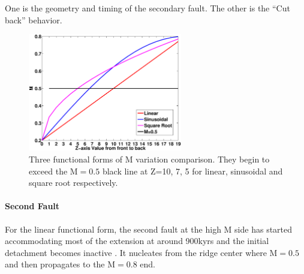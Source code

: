  One is the geometry and timing of the secondary fault. The other is the ``Cut back'' behavior. 

\begin{figure}[h]
  \centering
    \includegraphics[width=0.6\textwidth]{./Figures/fig_Results3_1.eps}
  \caption{Three functional forms of M variation comparison. They begin to exceed the M$=0.5$ black line at Z=10, 7, 5 for linear, sinusoidal and square root respectively.}
 \label{fig_Results3_1}
\end{figure}   

\paragraph{Second Fault}\label{para_SecondaryFault}

For the linear functional form, the second fault  at the high M side has started accommodating most of the extension at around 900kyrs and the initial detachment becomes inactive . It nucleates from the ridge center where M$=0.5$ and then propagates to the M$=0.8$ end. %

